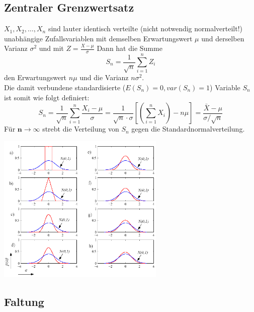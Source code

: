 	\subsection{Zentraler Grenzwertsatz}
		\begin{minipage}[]{11cm}
			$X_1, X_2, \ldots , X_n$ sind lauter identisch verteilte (nicht notwendig normalverteilt!)
			unabhängige Zufallsvariablen mit demselben Erwartungswert $\mu$ und derselben Varianz $\sigma^2$
			und mit $Z = \frac{X-\mu}{\sigma}$
		  	Dann hat die Summe
			\begin{equation}
				S_n = \frac{1}{\sqrt{n}}\sum_{i=1}^n Z_i \nonumber
			\end{equation}
			den Erwartungswert $n \mu$ und die Varianz $n \sigma^2$. \\
		  	Die damit verbundene standardisierte ($E(S_n) = 0, var(S_n) = 1$) Variable $S_n$ ist somit wie
		  	folgt definiert: \\ 
			\begin{equation}
				S_n = \frac{1}{\sqrt{n}}\sum_{i=1}^n \frac{X_i - \mu}{\sigma}
				= \frac{1}{\sqrt{n}\cdot \sigma}\left[\left(\sum\limits_{i=1}^n X_i\right) -n \mu\right]
				=\dfrac{\bar{X} - \mu}{\sigma / \sqrt{n}} \nonumber
			\end{equation}
		  	Für $\boldsymbol{n \to \infty}$ strebt die Verteilung von $S_n$ gegen die Standardnormalverteilung. \\
		  \end{minipage}
		  \begin{minipage}[]{8cm}
		  	\includegraphics[width=8cm]{./bilder/grenzwertsatz.png}
		  \end{minipage}
	  	
	\subsection{Faltung }
		
